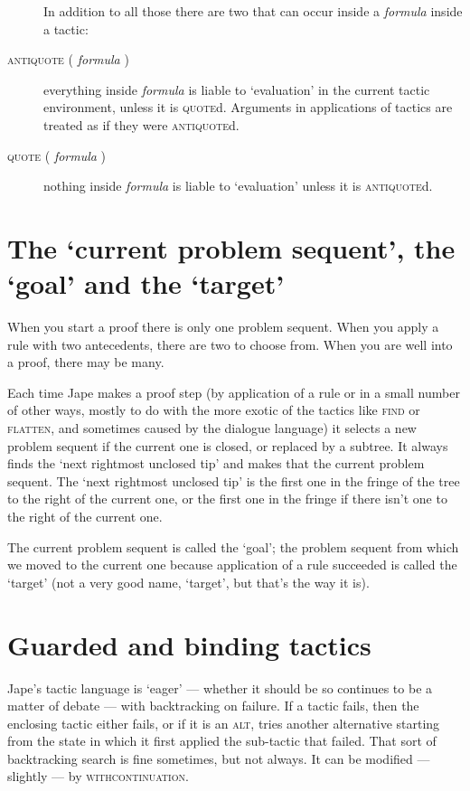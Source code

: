 \begin{description}
In addition to all those there are two that can occur inside a \textit{formula} inside a tactic:


\item [\textsc{antiquote} ( \textit{formula} )] everything inside \textit{formula} is liable to `evaluation' in the current tactic environment, unless it is \textsc{quote}d. Arguments in applications of tactics are treated as if they were \textsc{antiquote}d.


\item [\textsc{quote} ( \textit{formula} )] nothing inside \textit{formula} is liable to `evaluation' unless it is \textsc{antiquote}d.

\end{description}

\section{The `current problem sequent', the `goal' and the `target'}


When you start a proof there is only one problem sequent. When you apply a rule with two antecedents, there are two to choose from. When you are well into a proof, there may be many.


Each time Jape makes a proof step (by application of a rule or in a small number of other ways, mostly to do with the more exotic of the tactics like \textsc{find} or \textsc{flatten}, and sometimes caused by the dialogue language) it selects a new problem sequent if the current one is closed, or replaced by a subtree. It always finds the `next rightmost unclosed tip' and makes that the current problem sequent. The `next rightmost unclosed tip' is the first one in the fringe of the tree to the right of the current one, or the first one in the fringe if there isn't one to the right of the current one.


The current problem sequent is called the `goal'; the problem sequent from which we moved to the current one because application of a rule succeeded is called the `target' (not a very good name, `target', but that's the way it is).


\section{Guarded and binding tactics}


Jape's tactic language is `eager' --- whether it should be so continues to be a matter of debate --- with backtracking on failure. If a tactic fails, then the enclosing tactic either fails, or if it is an \textsc{alt}, tries another alternative starting from the state in which it first applied the sub-tactic that failed. That sort of backtracking search is fine sometimes, but not always. It can be modified --- slightly --- by \textsc{withcontinuation}.


